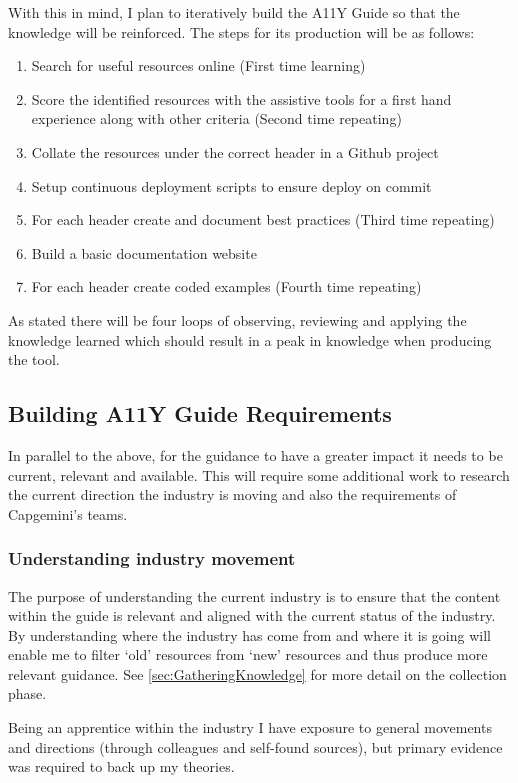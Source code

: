 With this in mind, I plan to iteratively build the A11Y Guide so
that the knowledge will be reinforced. The steps for its production will be
as follows:
\begin{enumerate}
  \item Search for useful resources online (First time learning)
  \item Score the identified resources with the assistive tools for a first hand
  experience along with other criteria (Second time repeating)
  \item Collate the resources under the correct header in a Github project
  \item Setup continuous deployment scripts to ensure deploy on commit
  \item For each header create and document best practices (Third time
  repeating)
  \item Build a basic documentation website
  \item For each header create coded examples (Fourth time repeating)
\end{enumerate}

As stated there will be four loops of observing, reviewing and
applying the knowledge learned which should result in a peak in knowledge
when producing the tool.

\subsection{Building A11Y Guide Requirements}
In parallel to the above, for the guidance to have a greater impact it
needs to be current, relevant and available. This will require some additional
work to research the current direction the industry is moving and also the
requirements of Capgemini's teams.

\subsubsection{Understanding industry movement}
\label{sec:uim}
The purpose of understanding the current industry is to ensure that the
content within the guide is relevant and aligned with the current status of the
industry. By understanding where the industry has come from and where it is
going will enable me to filter `old' resources from `new' resources and thus
produce more relevant guidance. See \ref{sec:GatheringKnowledge} for more
detail on the collection phase.

Being an apprentice within the industry I have exposure to general movements
and directions (through colleagues and self-found sources), but primary
evidence was required to back up my theories.

